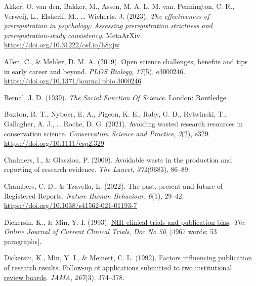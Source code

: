 \documentclass[
  ,jou, a4paper,floatsintext]{apa6}
\newlength{\cslhangindent}
\newlength{\cslentryspacingunit} %
\newenvironment{CSLReferences}[2] %
 {%
  \setlength{\parindent}{0pt}
  \ifodd #1
  \let\oldpar\par
  \def\par{\hangindent=\cslhangindent\oldpar}
  \fi
  \setlength{\parskip}{#2\cslentryspacingunit}
 }%
 {}
\begin{document}
\hypertarget{refs}{}
\begin{CSLReferences}{1}{0}
\leavevmode{}%
Akker, O. van den, Bakker, M., Assen, M. A. L. M. van, Pennington, C. R., Verweij, L., Elsherif, M., \ldots{} Wicherts, J. (2023). \emph{The effectiveness of preregistration in psychology: {Assessing} preregistration strictness and preregistration-study consistency}. {MetaArXiv}. \url{https://doi.org/10.31222/osf.io/h8xjw}

\leavevmode{}%
Allen, C., \& Mehler, D. M. A. (2019). Open science challenges, benefits and tips in early career and beyond. \emph{PLOS Biology}, \emph{17}(5), e3000246. \url{https://doi.org/10.1371/journal.pbio.3000246}

\leavevmode{}%
Bernal, J. D. (1939). \emph{The {Social Function Of Science}}. {London}: {Routledge}.

\leavevmode{}%
Buxton, R. T., Nyboer, E. A., Pigeon, K. E., Raby, G. D., Rytwinski, T., Gallagher, A. J., \ldots{} Roche, D. G. (2021). Avoiding wasted research resources in conservation science. \emph{Conservation Science and Practice}, \emph{3}(2), e329. \url{https://doi.org/10.1111/csp2.329}

\leavevmode{}%
Chalmers, I., \& Glasziou, P. (2009). Avoidable waste in the production and reporting of research evidence. \emph{The Lancet}, \emph{374}(9683), 86--89.

\leavevmode{}%
Chambers, C. D., \& Tzavella, L. (2022). The past, present and future of {Registered Reports}. \emph{Nature Human Behaviour}, \emph{6}(1), 29--42. \url{https://doi.org/10.1038/s41562-021-01193-7}

\leavevmode{}%
Dickersin, K., \& Min, Y. I. (1993). \href{https://www.ncbi.nlm.nih.gov/pubmed/8306005}{{NIH} clinical trials and publication bias}. \emph{The Online Journal of Current Clinical Trials}, \emph{Doc No 50}, {[}4967 words; 53 paragraphs{]}.

\leavevmode{}%
Dickersin, K., Min, Y. I., \& Meinert, C. L. (1992). \href{https://www.ncbi.nlm.nih.gov/pubmed/1727960}{Factors influencing publication of research results. {Follow-up} of applications submitted to two institutional review boards}. \emph{JAMA}, \emph{267}(3), 374--378.


\end{CSLReferences}
\end{document}
